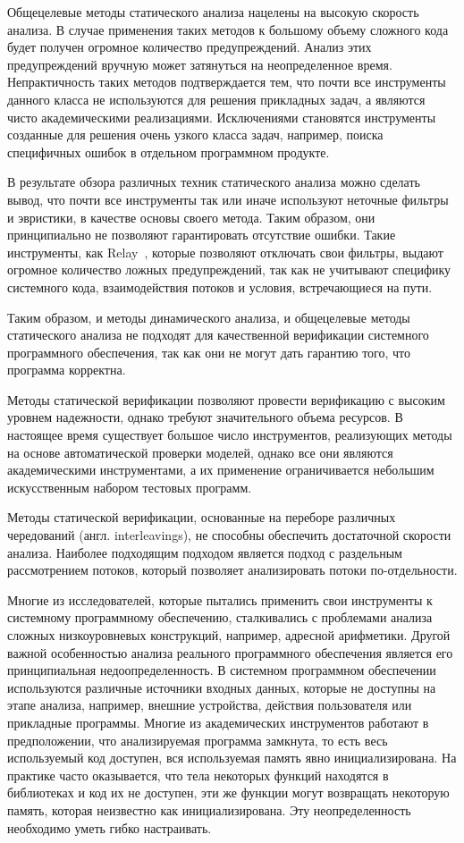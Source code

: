 Общецелевые методы статического анализа нацелены на высокую скорость анализа.
В случае применения таких методов к большому объему сложного кода будет получен огромное количество предупреждений.
Анализ этих предупреждений вручную может затянуться на неопределенное время.
Непрактичность таких методов подтверждается тем, что почти все инструменты данного класса не используются для решения прикладных задач, а являются чисто академическими реализациями. 
Исключениями становятся инструменты созданные для решения очень узкого класса задач, например, поиска специфичных ошибок в отдельном программном продукте.

В результате обзора различных техник статического анализа можно сделать вывод, что почти все инструменты так или иначе используют неточные фильтры и эвристики, в качестве основы своего метода.
Таким образом, они принципиально не позволяют гарантировать отсутствие ошибки.
Такие инструменты, как Relay~\cite{Relay}, которые позволяют отключать свои фильтры, выдают огромное количество ложных предупреждений, так как не учитывают специфику системного кода, взаимодействия потоков и условия, встречающиеся на пути.

Таким образом, и методы динамического анализа, и общецелевые методы статического анализа не подходят для качественной верификации системного программного обеспечения, так как они не могут дать гарантию того, что программа корректна.

Методы статической верификации позволяют провести верификацию с высоким уровнем надежности, однако требуют значительного объема ресурсов. 
В настоящее время существует большое число инструментов, реализующих методы на основе автоматической проверки моделей, однако все они являются академическими инструментами, а их применение ограничивается небольшим искусственным набором тестовых программ.

Методы статической верификации, основанные на переборе различных чередований (англ. interleavings), не способны обеспечить достаточной скорости анализа. 
Наиболее подходящим подходом является подход с раздельным рассмотрением потоков, который позволяет анализировать потоки по-отдельности. 

Многие из исследователей, которые пытались применить свои инструменты к системному программному обеспечению, сталкивались с проблемами анализа сложных низкоуровневых конструкций, например, адресной арифметики.
Другой важной особенностью анализа реального программного обеспечения является его принципиальная недоопределенность.
В системном программном обеспечении используются различные источники входных данных, которые не доступны на этапе анализа, например, внешние устройства, действия пользователя или прикладные программы. 
Многие из академических инструментов работают в предположении, что анализируемая программа замкнута, то есть весь используемый код доступен, вся используемая память явно инициализирована.
На практике часто оказывается, что тела некоторых функций находятся в библиотеках и код их не доступен, эти же функции могут возвращать некоторую память, которая неизвестно как инициализирована.
Эту неопределенность необходимо уметь гибко настраивать. 


